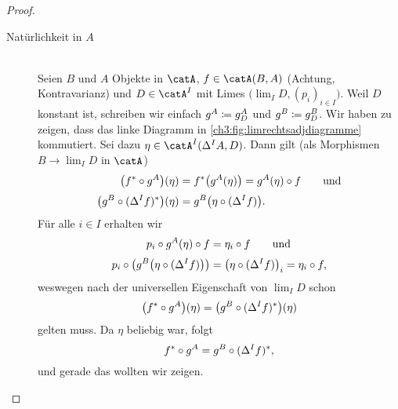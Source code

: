 \begin{proof}
    \begin{description}
        \item[Natürlichkeit in \boldmath$A$]\hfill\\
            Seien $B$ und $A$ Objekte in $\catA$, $f\in\catA(B,A)$ (Achtung,
            Kontravarianz) und $D\in\catA^I$ mit Limes $\bigl(\lim_I
            D,(p_i)_{i\in I}\bigr)$. Weil $D$ konstant ist, schreiben wir
            einfach $g^A \coloneqq g_D^A$ und $g^B \coloneqq g_D^B$.
            Wir haben zu zeigen, dass das linke Diagramm in
            \cref{ch3:fig:limrechtsadjdiagramme} kommutiert.  Sei dazu
            $\eta\in\catA^I(\Delta^I A, D)$. Dann gilt (als Morphismen
            $B\to\lim_I D$ in $\catA$)
            \begin{align*}
                \bigl(f^* \after g^A\bigr)(\eta)
                &= f^*\bigl( g^A(\eta) \bigr)
                 = g^A(\eta) \after f
                \qquad\text{und}\\[0.5ex]
                \bigl(g^B \after (\Delta^I f)^*\bigr)(\eta)
                &= g^B\bigl( \eta \after (\Delta^I f) \bigr)
            . \end{align*}
            Für alle $i\in I$ erhalten wir
            \begin{align*}
                p_i\after g^A(\eta)\after f 
                &= \eta_i\after f
                \qquad\text{und}\\[0.5ex]
                p_i\after \bigl(g^B\bigl( \eta \after (\Delta^I f) \bigr)\bigr)
                &= \bigl( \eta \after (\Delta^I f)\bigr)_i
                 = \eta_i \after f
            , \end{align*}
            weswegen nach der universellen Eigenschaft von $\lim_I D$
            schon 
            \[ \bigl(f^* \after g^A\bigr)(\eta) 
                = \bigl(g^B \after (\Delta^I f)^*\bigr)(\eta)
            \]
            gelten muss. Da $\eta$ beliebig war, folgt
            \[ f^* \after g^A = g^B \after (\Delta^I f)^* , \]
            und gerade das wollten wir zeigen.
            

\end{description}
\end{proof}
